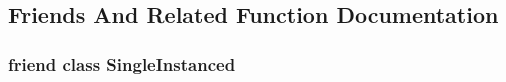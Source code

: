 \subsection{Friends And Related Function Documentation}
\hypertarget{classZeta_1_1WorldManager_a2fa95d69b32a77fffa4b730679a8b08c}{
\subsubsection[{Single\+Instanced}]{\setlength{\rightskip}{0pt plus 5cm}friend class {\bf Single\+Instanced}\hspace{0.3cm}{\ttfamily [friend]}}}\label{classZeta_1_1WorldManager_a2fa95d69b32a77fffa4b730679a8b08c}


